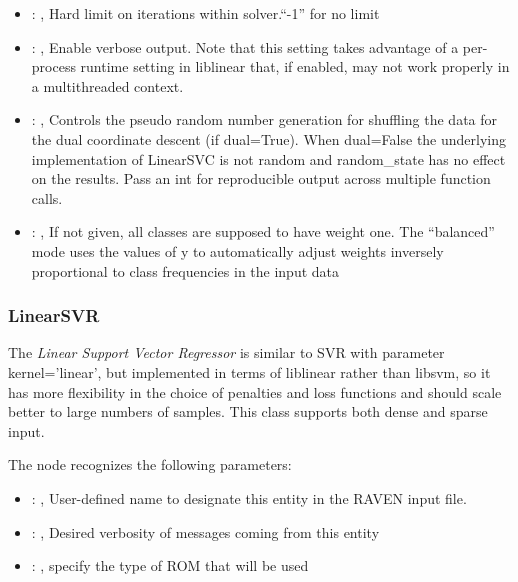 \begin{itemize}
    \item {}: , 
      Hard limit on iterations within solver.``-1'' for no limit

    \item {}: , 
      Enable verbose output. Note that this setting takes advantage
      of a per-process runtime setting in liblinear that, if enabled, may not
      work properly in a multithreaded context.

    \item {}: , 
      Controls the pseudo random number generation for shuffling
      the data for the dual coordinate descent (if dual=True). When dual=False
      the underlying implementation of LinearSVC is not random and
      random\_state has no effect on the results. Pass an int for reproducible
      output across multiple function calls.

    \item {}: \xmlDesc{[balanced]}, 
      If not given, all classes are supposed to have weight one.
      The “balanced” mode uses the values of y to automatically adjust weights
      inversely proportional to class frequencies in the input data
  \end{itemize}


\subsubsection{LinearSVR}
  The  \textit{Linear Support Vector Regressor} is
  similar to SVR with parameter kernel=’linear’, but implemented in terms of liblinear rather than
  libsvm,                             so it has more flexibility in the choice of penalties and loss
  functions and should scale better to large numbers of samples.                             This
  class supports both dense and sparse input.

  The  node recognizes the following parameters:
    \begin{itemize}
      \item {}: , 
        User-defined name to designate this entity in the RAVEN input file.
      \item {}: , 
        Desired verbosity of messages coming from this entity
      \item {}: , 
        specify the type of ROM that will be used
  \end{itemize}

